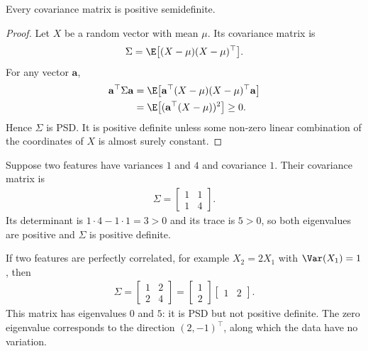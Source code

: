 \documentclass[a4paper, 12pt]{book}
\begin{document}
\begin{theorem}
    Every covariance matrix is positive semidefinite.
\end{theorem}
\begin{proof}
    Let $X$ be a random vector with mean $\mu$. Its covariance
    matrix is
    \begin{align}
        \Sigma
        = \E\big[(X-\mu)(X-\mu)^\top\big].
    \end{align}
    For any vector $\mathbf{a}$,
    \begin{align}
        \mathbf{a}^\top\Sigma\mathbf{a} &= \E\big[\mathbf{a}^\top(X-\mu)
          (X-\mu)^\top\mathbf{a}\big]\\
       & = \E\big[(\mathbf{a}^\top(X-\mu))^2\big] \geq 0.
    \end{align}
    Hence $\Sigma$ is PSD. It is positive definite unless some non-zero
    linear combination of the coordinates of $X$ is almost surely constant.
\end{proof}

\begin{example}
    Suppose two features have variances $1$ and $4$ and covariance $1$. Their
    covariance matrix is
    \begin{align}
        {\Sigma} = \begin{bmatrix}1&1\\1&4\end{bmatrix}.
    \end{align}
    Its determinant is $1\cdot4-1\cdot1=3>0$ and its trace is $5>0$, so both
    eigenvalues are positive and ${\Sigma}$ is positive definite.
\end{example}

\begin{example}
    If two features are perfectly correlated, for example $X_2 = 2X_1$ with
    $\Var(X_1)=1$, then
    \begin{align}
        {\Sigma}
        = \begin{bmatrix}1&2\\2&4\end{bmatrix}
        = \begin{bmatrix}1\\2\end{bmatrix}\begin{bmatrix}1&2\end{bmatrix}.
    \end{align}
    This matrix has eigenvalues $0$ and $5$: it is PSD but not positive definite. The
    zero eigenvalue corresponds to the direction $(2,-1)^\top$, along which the data
    have no variation.
\end{example}
\end{document}
